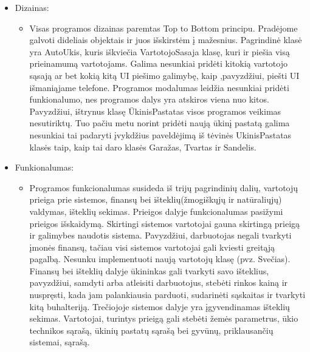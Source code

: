 \documentclass[oneside]{VUMIFPSkursinis}
\begin{document}
	\begin{itemize}
		\item Dizainas:
			\begin{itemize}
				\item Visas programos dizainas paremtas Top to Bottom principu. Pradėjome galvoti dideliais objektais ir juos išskirstėm į mažesnius. Pagrindinė klasė yra AutoUkis, kuris iškviečia VartotojoSasaja klasę, kuri ir piešia visą prieinamumą vartotojams. Galima nesunkiai pridėti kitokią vartotojo sąsają ar bet kokią kitą UI piešimo galimybę, kaip ,pavyzdžiui, piešti UI išmaniąjame telefone. Programos modalumas leidžia nesunkiai pridėti funkionalumo, nes programos dalys yra atskiros viena nuo kitos. Pavyzdžiui, ištrynus klasę ŪkinisPastatas visos programos veikimas nesutiriktų. Tuo pačiu metu norint pridėti naują ūkinį pastatą galima nesunkiai tai padaryti įvykdžius paveldėjimą iš tėvinės UkinisPastatas klasės taip, kaip tai daro klasės Garažas, Tvartas ir Sandelis.  
			\end{itemize}
		\item Funkionalumas: 
			\begin{itemize}
				\item Programos funkcionalumas susideda iš trijų pagrindinių dalių, vartotojų prieiga prie sistemos, finansų bei išteklių(žmogiškųjų ir natūraliųjų) valdymas, išteklių sekimas. Prieigos dalyje funkcionalumas pasižymi prieigos išskaidymą. Skirtingi sistemos vartotojai gauna skirtingą prieigą ir galimybes naudotis sistema. Pavyzdžiui, darbuotojas negali tvarkyti įmonės finansų, tačiau visi sistemos vartotojai gali kviesti greitąją pagalbą. Nesunku implementuoti naują vartotojų klasę (pvz. Svečias). Finansų bei išteklių dalyje ūkininkas gali tvarkyti savo išteklius, pavyzdžiui, samdyti arba atleisiti darbuotojus, stebėti rinkos kainą ir nuspręsti, kada jam palankiausia parduoti, sudarinėti sąskaitas ir tvarkyti kitą buhalteriją. Trečiojoje sistemos dalyje yra įgyvendinamas išteklių sekimas. Vartotojai, turintys prieigą gali stebėti žemės parametrus, ūkio technikos sąrašą, ūkinių pastatų sąrašą bei gyvūnų, priklausančių sistemai, sąrašą.
			\end{itemize}

	\end{itemize}
\end{document}
